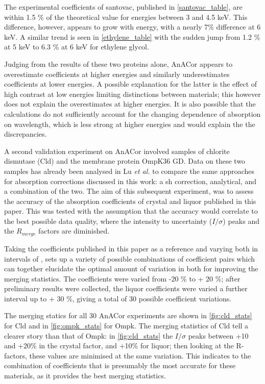 The experimental coefficients of santovac, published in \cref{santovac_table}, are within 1.5 \% of the theoretical value for energies between 3 and 4.5 keV. This difference, however, appears to grow with energy, with a nearly 7\% difference at 6 keV. A similar trend is seen in \cref{ethylene_table} with the sudden jump from 1.2 \% at 5 keV to 6.3 \% at 6 keV for ethylene glycol.

Judging from the results of these two proteins alone, AnACor appears to overestimate coefficients at higher energies and similarly underestimates coefficients at lower energies. A possible explanation for the latter is the effect of high contrast at low energies limiting distinctions between materials; this however does not explain the overestimates at higher energies. It is also possible that the calculations do not sufficiently account for the changing dependence of absorption on wavelength, which is less strong at higher energies and would explain the the discrepancies.

A second validation experiment on AnACor involved samples of chlorite dismutase (Cld) and the membrane protein OmpK36 GD. Data on these two samples has already been analysed in Lu \textit{et al.} \cite{Lu} to compare the same approaches for absorption corrections discussed in this work: a \ac{sh} correction, analytical, and a combination of the two. The aim of this subsequent experiment, was to assess the accuracy of the absorption coefficients of crystal and liquor published in this paper. This was tested with the assumption that the accuracy would correlate to the best possible data quality, where the intensity to uncertainty ($I / \sigma$) peaks and the $R_{merge}$ factors are diminished.

Taking the coefficients published in this paper as a reference and varying both in intervals of , sets up a variety of possible combinations of coefficient pairs which can together elucidate the optimal amount of variation in both for improving the merging statistics. The coefficients were varied from -20 \% to + 20 \%; after preliminary results were collected, the liquor coefficients were varied a further interval up to + 30 \%, giving a total of 30 possible coefficient variations. %

The merging statics for all 30 AnACor experiments are shown in \cref{fig:cld_stats} for Cld and in \cref{fig:ompk_stats} for Ompk. The merging statistics of Cld tell a clearer story than that of Ompk: in \cref{fig:cld_stats} the $I/\sigma$ peaks between +10 and +20\% in the crystal factor, and +10\% for liquor; then looking at the R-factors, these values are minimised at the same variation. This indicates to the combination of coefficients that is presumably the most accurate for these materials, as it provides the best merging statistics.

